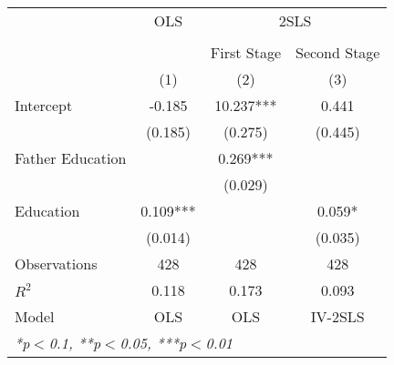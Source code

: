 \begin{tabular}{lccc}
  \toprule
  \toprule
  & \multicolumn{1}{c}{OLS} & \multicolumn{2}{c}{2SLS} \\
  \cmidrule(lr){2-2}\cmidrule(lr){3-4} \\
  & \multicolumn{1}{c}{} & \multicolumn{1}{c}{First Stage} & \multicolumn{1}{c}{Second Stage} \\
   & (1) & (2) & (3)\\
  \midrule
  Intercept & -0.185 & 10.237*** & 0.441 \\
   & (0.185) & (0.275) & (0.445) \\
  Father Education &  & 0.269*** &  \\
   &  & (0.029) &  \\
  Education & 0.109*** &  & 0.059* \\
   & (0.014) &  & (0.035) \\
  \midrule
  Observations & 428 & 428 & 428 \\
  $R^2$ & 0.118 & 0.173 & 0.093 \\
  Model & OLS & OLS & IV-2SLS \\
  \bottomrule
  \multicolumn{4}{l}{{\small \textit{*p$<$0.1, **p$<$0.05, ***p$<$0.01}}}\\
\end{tabular}
